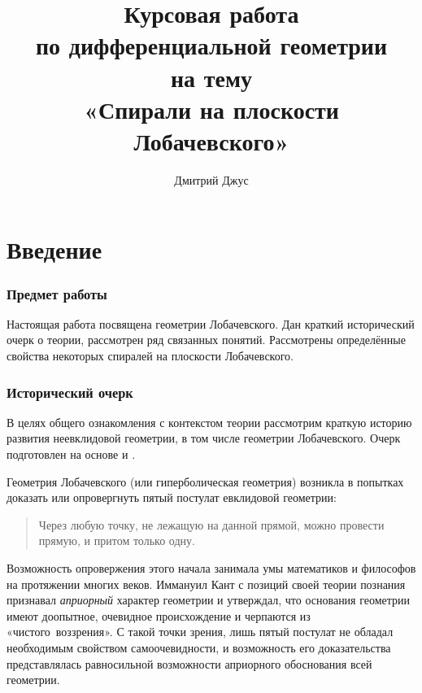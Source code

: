 \documentclass{article}
\numberwithin{equation}{section}
\begin{document}
\author{Дмитрий Джус}
\title{Курсовая работа\\ по дифференциальной геометрии\\ на тему \\
  \Huge{«Спирали на плоскости Лобачевского»}}
\pretitle{\begin{center}\LARGE}
\posttitle{\par\end{center}\vskip 3pc}
\date{}
\maketitle
\thispagestyle{empty}

\clearpage

\tableofcontents
\clearpage

\listoffigures
\clearpage

\part{Введение}
\section{Предмет работы}

Настоящая работа посвящена геометрии Лобачевского. Дан краткий
исторический очерк о теории, рассмотрен ряд связанных понятий.
Рассмотрены определённые свойства некоторых спиралей на плоскости
Лобачевского.

\section{Исторический очерк}
\label{sec:intro}

В целях общего ознакомления с контекстом теории рассмотрим краткую
историю развития неевклидовой геометрии, в том числе геометрии
Лобачевского. Очерк подготовлен на основе \cite{milnor82} и
\cite{norden56}.

Геометрия Лобачевского (или гиперболическая геометрия) возникла в
попытках доказать или опровергнуть пятый постулат евклидовой
геометрии:

\begin{quote}
  Через любую точку, не лежащую на данной прямой, можно провести
  прямую, и притом только одну.
\end{quote}

Возможность опровержения этого начала занимала умы математиков и
философов на протяжении многих веков. Иммануил Кант с позиций своей
теории познания признавал \emph{априорный} характер геометрии и
утверждал, что основания геометрии имеют доопытное, очевидное
происхождение и черпаются из «чистого воззрения». С такой точки
зрения, лишь пятый постулат не обладал необходимым свойством
самоочевидности, и возможность его доказательства представлялась
равносильной возможности априорного обоснования всей геометрии.
\end{document}

